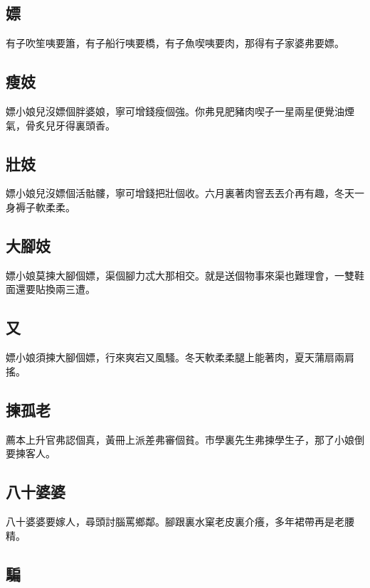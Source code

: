 \subsection*{嫖}

有子吹笙咦要簫，有子船行咦要橋，有子魚喫咦要肉，那得有子家婆弗要嫖。

\subsection*{瘦妓}

嫖小娘兒沒嫖個胖婆娘，寧可增錢瘦個強。你弗見肥豬肉喫子一星兩星便覺油煙氣，骨炙兒牙得裏頭香。

\subsection*{壯妓}

嫖小娘兒沒嫖個活骷髏，寧可增錢把壯個收。六月裏著肉窨丟丟介再有趣，冬天一身褥子軟柔柔。

\subsection*{大腳妓}

嫖小娘莫揀大腳個嫖，渠個腳力忒大那相交。就是送個物事來渠也難理會，一雙鞋面還要貼換兩三遭。

\subsection*{又}

嫖小娘須揀大腳個嫖，行來爽宕又風騷。冬天軟柔柔腿上能著肉，夏天蒲扇兩肩搖。

\subsection*{揀孤老}

薦本上升官弗認個真，黃冊上派差弗審個貧。市學裏先生弗揀學生子，那了小娘倒要揀客人。

\subsection*{八十婆婆}

八十婆婆要嫁人，尋頭討腦罵鄉鄰。腳跟裏水窠老皮裏介癢，多年裙帶再是老腰精。

\subsection*{騙}

